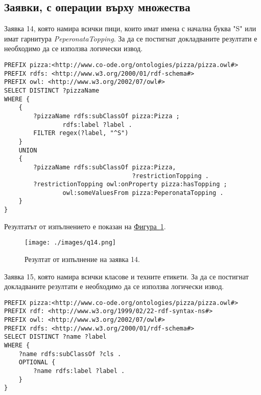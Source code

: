 \documentclass[12pt]{article}
\begin{document}
        
\clearpage
\pagebreak

    \subsection{Заявки, с операции върху множества}

        Заявка 14, която намира всички пици, които имат имена с начална буква "S" или имат гарнитура \textit{PeperonataTopping}. За да се постигнат докладваните резултати е необходимо да се използва логически извод.

        \begin{lstlisting}[language=SPARQL,style=sparql]
PREFIX pizza:<http://www.co-ode.org/ontologies/pizza/pizza.owl#>
PREFIX rdfs: <http://www.w3.org/2000/01/rdf-schema#>
PREFIX owl: <http://www.w3.org/2002/07/owl#>
SELECT DISTINCT ?pizzaName
WHERE {
    {
        ?pizzaName rdfs:subClassOf pizza:Pizza ;
                rdfs:label ?label .
        FILTER regex(?label, "^S")
    }
    UNION
    {
        ?pizzaName rdfs:subClassOf pizza:Pizza,
                                   ?restrictionTopping .
        ?restrictionTopping owl:onProperty pizza:hasTopping ;
                owl:someValuesFrom pizza:PeperonataTopping .
    }
}\end{lstlisting}

        Резултатът от изпълнението е показан на \hyperref[fig:q14]{Фигура~\ref*{fig:q14}}.

        \begin{center}
            \begin{figure}
            \centering
                \texttt{[image: ./images/q14.png]}
                \caption{Резултат от изпълнение на заявка 14.}
                \label{fig:q14}
            \end{figure}
        \end{center}
                
\clearpage
\pagebreak

        Заявка 15, която намира всички класове и техните етикети. За да се постигнат докладваните резултати е необходимо да се използва логически извод.

        \begin{lstlisting}[language=SPARQL,style=sparql]
PREFIX pizza:<http://www.co-ode.org/ontologies/pizza/pizza.owl#>
PREFIX rdf: <http://www.w3.org/1999/02/22-rdf-syntax-ns#>
PREFIX owl: <http://www.w3.org/2002/07/owl#>
PREFIX rdfs: <http://www.w3.org/2000/01/rdf-schema#>
SELECT DISTINCT ?name ?label
WHERE {
    ?name rdfs:subClassOf ?cls .
    OPTIONAL {
        ?name rdfs:label ?label .
    }
}\end{lstlisting}
\end{document}
